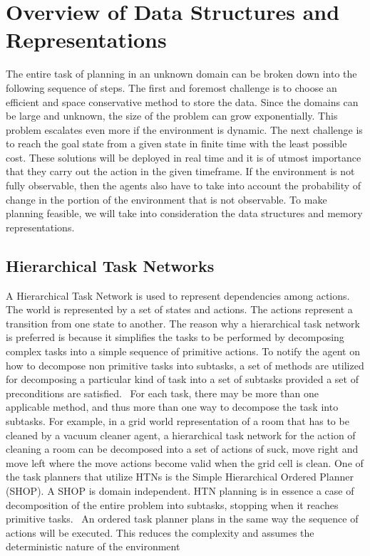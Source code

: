 \documentclass[tog]{acmsiggraph}
\begin{document}
\section{Overview of Data Structures and Representations}
The entire task of planning in an unknown domain can be broken down
into the following sequence of steps. The first and foremost challenge
is to choose an efficient and space conservative method to store the
data. Since the domains can be large and unknown, the size of the
problem can grow exponentially. This problem escalates even more if
the environment is dynamic. The next challenge is to reach the goal
state from a given state in finite time with the least possible cost.
These solutions will be deployed in real time and it is of utmost
importance that they carry out the action in the given timeframe. If
the environment is not fully observable, then the agents also have to
take into account the probability of change in the portion of the
environment that is not observable. To make planning feasible, we will
take into consideration the data structures and memory
representations.

\subsection{Hierarchical Task Networks}

A Hierarchical Task Network is used to represent dependencies among
actions. The world is represented by a set of states and actions. The
actions represent a transition from one state to another. The reason
why a hierarchical task network is preferred is because it simplifies
the tasks to be performed by decomposing complex tasks into a simple
sequence of primitive actions. To notify the agent on how to decompose
non primitive tasks into subtasks, a set of methods are utilized for
decomposing a particular kind of task into a set of subtasks provided
a set of preconditions are satisfied.~\cite{erol1994htn} For each task, there may be more
than one applicable method, and thus more than one way to decompose
the task into subtasks. For example, in a grid
world representation of a room that has to be cleaned by a vacuum
cleaner agent, a hierarchical task network for the action of cleaning
a room can be decomposed into a set of actions of suck, move right and
move left where the move actions become valid when the grid cell is
clean. One of the task planners that utilize HTNs is the Simple
Hierarchical Ordered Planner (SHOP). A SHOP is domain independent. HTN
planning is in essence a case of decomposition of the entire problem
into subtasks, stopping when it reaches primitive tasks.~\cite{nau1999shop} An ordered
task planner plans in the same way the sequence of actions will be
executed. This reduces the complexity and assumes the deterministic
nature of the environment
\end{document}
